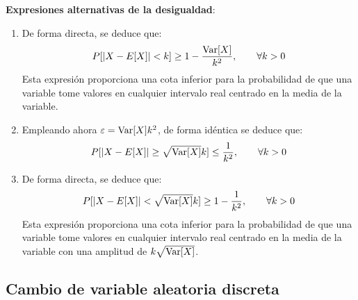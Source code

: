 \textbf{Expresiones alternativas de la desigualdad}:
\begin{enumerate}
    \item De forma directa, se deduce que:
    \begin{equation*}
        P[|X-E[X]| < k]\geq 1-\frac{\operatorname{Var}[X]}{k^2},\qquad \forall k>0
    \end{equation*}
    Esta expresión proporciona una cota inferior para la probabilidad de que una variable tome valores en cualquier intervalo real centrado en la media de la variable.

    \item Empleando ahora $\varepsilon=\operatorname{Var}[X]k^2$, de forma idéntica se deduce que:
    \begin{equation*}
        P[|X-E[X]|\geq \sqrt{\operatorname{Var}[X]}k]\leq \frac{1}{k^2},\qquad \forall k>0
    \end{equation*}

    \item De forma directa, se deduce que:
    \begin{equation*}
        P[|X-E[X]|< \sqrt{\operatorname{Var}[X]}k]\geq 1-\frac{1}{k^2},\qquad \forall k>0
    \end{equation*}
    Esta expresión proporciona una cota inferior para la probabilidad de que una variable tome valores en cualquier intervalo real centrado en la media de la variable con una amplitud de $k\sqrt{\operatorname{Var}[X]}$.
\end{enumerate}

\subsection{Cambio de variable aleatoria discreta}

